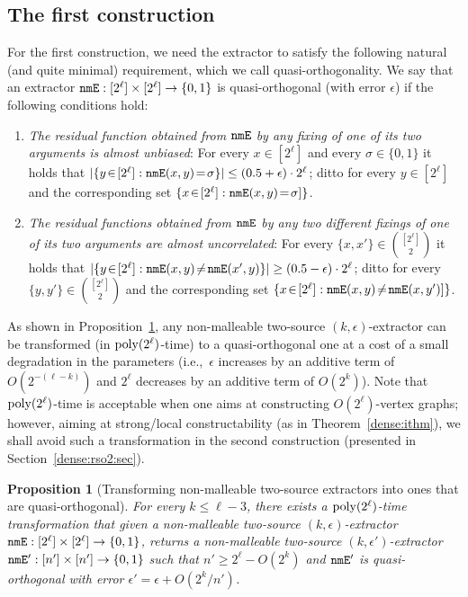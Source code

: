 \documentclass[10pt,a4paper]{article}
\newtheorem{proposition}[theorem]{Proposition}
\theoremstyle{definition}
\newcommand{\e}{\epsilon}
\newcommand{\bitset}{\{0,1\}}
\newcommand{\BP}{\begin{proposition}}   \newcommand{\EP}{\end{proposition}}
\newcommand{\BE}{\begin{enumerate}}
\newcommand{\EE}{\end{enumerate}}
\newcommand{\poly}{{\rm poly}}
\newcommand{\nmE}{{\tt nmE}}
\begin{document}
\subsection{The first construction}
\label{dense:rso1:sec}
For the first construction, we need the extractor to satisfy
the following natural (and quite minimal) requirement,
which we call quasi-orthogonality.
%
We say that an extractor ${\nmE}:[2^\ell]\times[2^\ell]\to\bitset$
is {\sf quasi-orthogonal} (with error $\e$)
if the following conditions hold:
\BE
\item
{\em The residual function obtained from $\nmE$ by any fixing
of one of its two arguments is almost unbiased}:
For every $x\in[2^\ell]$ and every $\sigma\in\bitset$ it holds that
$|\{y\!\in\![2^\ell]:\nmE(x,y)\!=\!\sigma\}|\leq(0.5+\e)\cdot2^{\ell}$;
ditto for every $y\in[2^\ell]$
and the corresponding set $\{x\!\in\![2^\ell]:\nmE(x,y)\!=\!\sigma]\}$.
\item
{\em The residual functions obtained from $\nmE$ by any two different
fixings of one of its two arguments are almost uncorrelated}:
For every $\{x,x'\}\in\binom{[2^\ell]}{2}$ it holds that
$|\{y\!\in\![2^\ell]:\nmE(x,y)\!\neq\!\nmE(x',y)\}|\geq(0.5-\e)\cdot2^{\ell}$;
ditto for every $\{y,y'\}\in\binom{[2^\ell]}{2}$
and the corresponding set $\{x\!\in\![2^\ell]:\nmE(x,y)\!\neq\!\nmE(x,y')]\}$.
\EE
As shown in Proposition~\ref{nmE-made-nice:prop},
%
any non-malleable two-source $(k,\e)$-extractor
can be transformed (in $\poly(2^\ell)$-time)
to a quasi-orthogonal one
at a cost of a small degradation in the parameters
(i.e.,~$\e$ increases by an additive term of $O(2^{-(\ell-k)})$
and $2^\ell$ decreases by an additive term of $O(2^{k})$).
Note that $\poly(2^\ell)$-time is acceptable
when one aims at constructing $O(2^\ell)$-vertex graphs;
however, aiming at strong/local constructability
(as in Theorem~\ref{dense:ithm}),
we shall avoid such a transformation in the second construction
(presented in Section~\ref{dense:rso2:sec}).

\BP[Transforming non-malleable two-source extractors
into ones that are quasi-orthogonal]
\label{nmE-made-nice:prop}
For every $k\leq\ell-3$,
there exists a $\poly(2^\ell)$-time transformation
that given a non-malleable two-source $(k,\e)$-extractor
${\nmE}:[2^\ell]\times[2^\ell]\to\bitset$,
returns a non-malleable two-source $(k,\e')$-extractor
${\nmE'}:[n']\times[n']\to\bitset$ such that $n'\geq2^\ell-O(2^k)$
and $\nmE'$ is quasi-orthogonal with error $\e'=\e+O(2^k/n')$.
%
\EP
%
\end{document}
